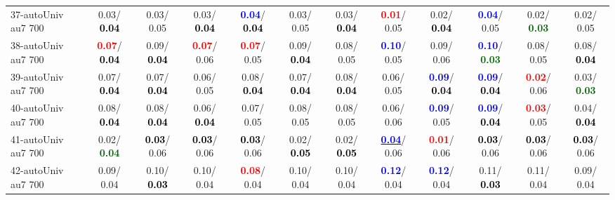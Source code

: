 \begin{table}[h]
\begin{center}
{\begin{tabular}{lc|c|c|c|c|c|c|c|c|c|c}
37-autoUniv au7 700 &   0.03/\textcolor{black}{\textbf{  0.04}} &   0.03/  0.05 &   0.03/\textcolor{black}{\textbf{  0.04}} & \textcolor{blue}{\textbf{  0.04}}/\textcolor{black}{\textbf{  0.04}} &   0.03/  0.05 &   0.03/\textcolor{black}{\textbf{  0.04}} & \textcolor{red}{\textbf{  0.01}}/  0.05 &   0.02/\textcolor{black}{\textbf{  0.04}} & \textcolor{blue}{\textbf{  0.04}}/  0.05 &   0.02/\textcolor{darkgreen}{\textbf{  0.03}} &   0.02/  0.05 \\
38-autoUniv au7 700 & \textcolor{red}{\textbf{  0.07}}/\textcolor{black}{\textbf{  0.04}} &   0.09/\textcolor{black}{\textbf{  0.04}} & \textcolor{red}{\textbf{  0.07}}/  0.06 & \textcolor{red}{\textbf{  0.07}}/  0.05 &   0.09/\textcolor{black}{\textbf{  0.04}} &   0.08/  0.05 & \textcolor{blue}{\textbf{  0.10}}/  0.05 &   0.09/  0.06 & \textcolor{blue}{\textbf{  0.10}}/\textcolor{darkgreen}{\textbf{  0.03}} &   0.08/  0.05 &   0.08/\textcolor{black}{\textbf{  0.04}} \\
39-autoUniv au7 700 &   0.07/\textcolor{black}{\textbf{  0.04}} &   0.07/\textcolor{black}{\textbf{  0.04}} &   0.06/  0.05 &   0.08/\textcolor{black}{\textbf{  0.04}} &   0.07/\textcolor{black}{\textbf{  0.04}} &   0.08/\textcolor{black}{\textbf{  0.04}} &   0.06/  0.05 & \textcolor{blue}{\textbf{  0.09}}/\textcolor{black}{\textbf{  0.04}} & \textcolor{blue}{\textbf{  0.09}}/\textcolor{black}{\textbf{  0.04}} & \textcolor{red}{\textbf{  0.02}}/  0.06 &   0.03/\textcolor{darkgreen}{\textbf{  0.03}} \\ \hline
40-autoUniv au7 700 &   0.08/\textcolor{black}{\textbf{  0.04}} &   0.08/\textcolor{black}{\textbf{  0.04}} &   0.06/\textcolor{black}{\textbf{  0.04}} &   0.07/  0.05 &   0.08/  0.05 &   0.08/  0.05 &   0.06/  0.06 & \textcolor{blue}{\textbf{  0.09}}/  0.05 & \textcolor{blue}{\textbf{  0.09}}/\textcolor{black}{\textbf{  0.04}} & \textcolor{red}{\textbf{  0.03}}/  0.05 &   0.04/\textcolor{black}{\textbf{  0.04}} \\
41-autoUniv au7 700 &   0.02/\textcolor{darkgreen}{\textbf{  0.04}} & \textcolor{black}{\textbf{  0.03}}/  0.06 & \textcolor{black}{\textbf{  0.03}}/  0.06 & \textcolor{black}{\textbf{  0.03}}/  0.06 &   0.02/\textcolor{black}{\textbf{  0.05}} &   0.02/\textcolor{black}{\textbf{  0.05}} & \underline{\textcolor{blue}{\textbf{  0.04}}}/  0.06 & \textcolor{red}{\textbf{  0.01}}/  0.06 & \textcolor{black}{\textbf{  0.03}}/  0.06 & \textcolor{black}{\textbf{  0.03}}/  0.06 & \textcolor{black}{\textbf{  0.03}}/  0.06 \\
42-autoUniv au7 700 &   0.09/  0.04 &   0.10/\textcolor{black}{\textbf{  0.03}} &   0.10/  0.04 & \textcolor{red}{\textbf{  0.08}}/  0.04 &   0.10/  0.04 &   0.10/  0.04 & \textcolor{blue}{\textbf{  0.12}}/  0.04 & \textcolor{blue}{\textbf{  0.12}}/  0.04 &   0.11/\textcolor{black}{\textbf{  0.03}} &   0.11/  0.04 &   0.09/  0.04 \\

\end{tabular}}
\end{center}
\end{table}
